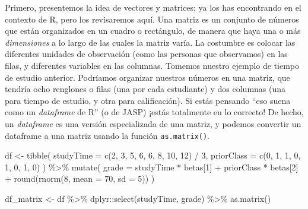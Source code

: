 \documentclass[
  12pt,
]{book}
\newenvironment{Shaded}{\begin{snugshade}}{\end{snugshade}}
\newcommand{\AttributeTok}[1]{\textcolor[rgb]{0.77,0.63,0.00}{#1}}
\newcommand{\DecValTok}[1]{\textcolor[rgb]{0.00,0.00,0.81}{#1}}
\newcommand{\FunctionTok}[1]{\textcolor[rgb]{0.00,0.00,0.00}{#1}}
\newcommand{\NormalTok}[1]{#1}
\newcommand{\OtherTok}[1]{\textcolor[rgb]{0.56,0.35,0.01}{#1}}
\newcommand{\SpecialCharTok}[1]{\textcolor[rgb]{0.00,0.00,0.00}{#1}}
\begin{document}
Primero, presentemos la idea de vectores y matrices; ya los has encontrando en el contexto de R, pero los revisaremos aquí. Una matriz es un conjunto de números que están organizados en un cuadro o rectángulo, de manera que haya una o más \emph{dimensiones} a lo largo de las cuales la matriz varía. La costumbre es colocar las diferentes unidades de observación (como las personas que observamos) en las filas, y diferentes variables en las columnas. Tomemos nuestro ejemplo de tiempo de estudio anterior. Podríamos organizar nuestros números en una matriz, que tendría ocho renglones o filas (una por cada estudiante) y dos columnas (una para tiempo de estudio, y otra para calificación). Si estás pensando ``eso suena como un \emph{dataframe} de R'' (o de JASP) ¡estás totalmente en lo correcto! De hecho, un \emph{dataframe} es una versión especializada de una matriz, y podemos convertir un dataframe a una matriz usando la función \texttt{as.matrix()}.

\begin{Shaded}
\begin{Highlighting}[]
\NormalTok{df }\OtherTok{\textless{}{-}}
  \FunctionTok{tibble}\NormalTok{(}
    \AttributeTok{studyTime =} \FunctionTok{c}\NormalTok{(}\DecValTok{2}\NormalTok{, }\DecValTok{3}\NormalTok{, }\DecValTok{5}\NormalTok{, }\DecValTok{6}\NormalTok{, }\DecValTok{6}\NormalTok{, }\DecValTok{8}\NormalTok{, }\DecValTok{10}\NormalTok{, }\DecValTok{12}\NormalTok{) }\SpecialCharTok{/} \DecValTok{3}\NormalTok{,}
    \AttributeTok{priorClass =} \FunctionTok{c}\NormalTok{(}\DecValTok{0}\NormalTok{, }\DecValTok{1}\NormalTok{, }\DecValTok{1}\NormalTok{, }\DecValTok{0}\NormalTok{, }\DecValTok{1}\NormalTok{, }\DecValTok{0}\NormalTok{, }\DecValTok{1}\NormalTok{, }\DecValTok{0}\NormalTok{)}
\NormalTok{  ) }\SpecialCharTok{\%\textgreater{}\%}
  \FunctionTok{mutate}\NormalTok{(}
    \AttributeTok{grade =} 
\NormalTok{      studyTime }\SpecialCharTok{*}\NormalTok{ betas[}\DecValTok{1}\NormalTok{] }\SpecialCharTok{+} 
\NormalTok{      priorClass }\SpecialCharTok{*}\NormalTok{ betas[}\DecValTok{2}\NormalTok{] }\SpecialCharTok{+} 
      \FunctionTok{round}\NormalTok{(}\FunctionTok{rnorm}\NormalTok{(}\DecValTok{8}\NormalTok{, }\AttributeTok{mean =} \DecValTok{70}\NormalTok{, }\AttributeTok{sd =} \DecValTok{5}\NormalTok{))}
\NormalTok{  )}

\NormalTok{df\_matrix }\OtherTok{\textless{}{-}} 
\NormalTok{  df }\SpecialCharTok{\%\textgreater{}\%}
\NormalTok{  dplyr}\SpecialCharTok{::}\FunctionTok{select}\NormalTok{(studyTime, grade) }\SpecialCharTok{\%\textgreater{}\%}
  \FunctionTok{as.matrix}\NormalTok{()}
\end{Highlighting}
\end{Shaded}
\end{document}
